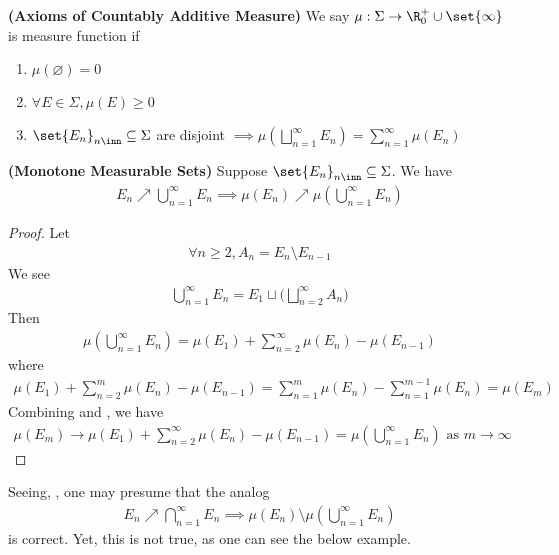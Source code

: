\documentclass{report}
\begin{document}
\begin{axiom}
\label{0.7.10}
\textbf{(Axioms of Countably Additive Measure)} We say $\mu:\Sigma \rightarrow \R^+_0\cup \set{\infty}$ is measure function if 
\begin{enumerate}[label=(\alph*)]
  \item $\mu (\varnothing)=0$
  \item $\forall E \in \Sigma , \mu(E)\geq 0$ 
  \item $\set{E_n}_{n\inn}\subseteq \Sigma $ are disjoint $\implies \mu(\bigsqcup_{n=1}^\infty E_n)=\sum_{n=1}^\infty \mu(E_n)$
\end{enumerate}
\end{axiom}
\begin{theorem}
\label{0.7.11}
\textbf{(Monotone Measurable Sets)} Suppose $\set{E_n}_{n\inn}\subseteq \Sigma$. We have 
\begin{align*}  
E_n\nearrow \bigcup_{n=1}^\infty E_n\implies \mu(E_n)\nearrow \mu (\bigcup_{n=1}^\infty E_n)
\end{align*}
\end{theorem}
\begin{proof}
Let
\begin{align*}
\forall n\geq 2,A_n=E_n\setminus E_{n-1}
\end{align*}
We see 
\begin{align*}
\bigcup_{n=1}^\infty E_n =E_1 \sqcup \Big( \bigsqcup_{n=2}^\infty A_n\Big)
\end{align*}
Then 
\begin{align}
\mu(\bigcup_{n=1}^\infty E_n)=\mu (E_1)+\sum_{n=2}^\infty \mu (E_n)-\mu (E_{n-1})\label{(2)}
\end{align}
where 
\begin{align}
\mu (E_1)+ \sum_{n=2}^m \mu (E_n)-\mu (E_{n-1})=\sum_{n=1}^m \mu (E_n)-\sum_{n=1}^{m-1}\mu (E_n)=\mu (E_m)\label{(3)}
\end{align}
Combining  and , we have
\begin{align*}
\mu (E_m)\to \mu (E_1)+\sum_{n=2}^\infty \mu (E_n)-\mu (E_{n-1})=\mu (\bigcup_{n=1}^\infty E_n)\text{ as }m \to \infty
\end{align*}
\end{proof}
\begin{mdframed}
Seeing, , one may presume that the analog 
\begin{align*}
E_n\nearrow \bigcap_{n=1}^\infty E_n \implies \mu (E_n)\setminus \mu (\bigcup_{n=1}^\infty E_n)
\end{align*}
is correct. Yet, this is not true, as one can see the below example.
\end{mdframed}
\end{document}
